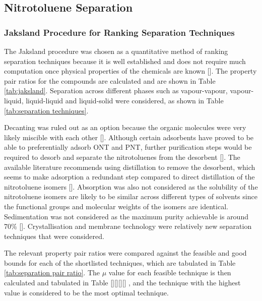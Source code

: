 \begin{landscape}

\subsection{Nitrotoluene Separation}
\subsubsection{Jaksland Procedure for Ranking Separation Techniques}
The Jaksland procedure was chosen as a quantitative method of ranking separation techniques because it is well established and does not require much computation once physical properties of the chemicals are known []. The property pair ratios for the compounds are calculated and are shown in Table \ref{tab:jaksland}. Separation across different phases such as vapour-vapour, vapour-liquid, liquid-liquid and liquid-solid were considered, as shown in Table \ref{tab:separation techniques}.

Decanting was ruled out as an option because the organic molecules were very likely miscible with each other []. Although certain adsorbents have proved to be able to preferentially adsorb ONT and PNT, further purification steps would be required to desorb and separate the nitrotoluenes from the desorbent []. The available literature recommends using distillation to remove the desorbent, which seems to make adsorption a redundant step compared to direct distillation of the nitrotoluene isomers []. Absorption was also not considered as the solubility of the nitrotoluene isomers are likely to be similar across different types of solvents since the functional groups and molecular weights of the isomers are identical. Sedimentation was not considered as the maximum purity achievable is around 70\% []. Crystallisation and membrane technology were relatively new separation techniques that were considered. 

The relevant property pair ratios were compared against the feasible and good bounds for each of the shortlisted techniques, which are tabulated in Table \ref{tab:separation pair ratio}. The $\mu$ value for each feasible technique is then calculated and tabulated in Table [][][][] , and the technique with the highest value is considered to be the most optimal technique. 


\end{landscape}
